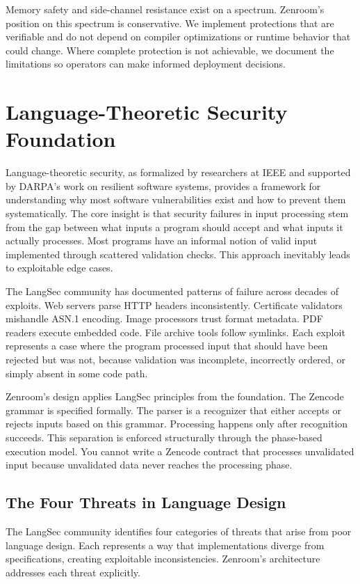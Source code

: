 Memory safety and side-channel resistance exist on a
spectrum. Zenroom's position on this spectrum is conservative. We
implement protections that are verifiable and do not depend on
compiler optimizations or runtime behavior that could change. Where
complete protection is not achievable, we document the limitations so
operators can make informed deployment decisions.

\section{Language-Theoretic Security Foundation}

Language-theoretic security, as formalized by researchers at IEEE and
supported by DARPA's work on resilient software systems, provides a
framework for understanding why most software vulnerabilities exist
and how to prevent them systematically. The core insight is that
security failures in input processing stem from the gap between what
inputs a program should accept and what inputs it actually
processes. Most programs have an informal notion of valid input
implemented through scattered validation checks. This approach
inevitably leads to exploitable edge cases.

The LangSec community has documented patterns of failure across
decades of exploits. Web servers parse HTTP headers
inconsistently. Certificate validators mishandle ASN.1 encoding. Image
processors trust format metadata. PDF readers execute embedded
code. File archive tools follow symlinks. Each exploit represents a
case where the program processed input that should have been rejected
but was not, because validation was incomplete, incorrectly ordered,
or simply absent in some code path.

Zenroom's design applies LangSec principles from the foundation. The
Zencode grammar is specified formally. The parser is a recognizer that
either accepts or rejects inputs based on this grammar. Processing
happens only after recognition succeeds. This separation is enforced
structurally through the phase-based execution model. You cannot write
a Zencode contract that processes unvalidated input because
unvalidated data never reaches the processing phase.

\subsection{The Four Threats in Language Design}

The LangSec community identifies four categories of threats that arise
from poor language design. Each represents a way that implementations
diverge from specifications, creating exploitable
inconsistencies. Zenroom's architecture addresses each threat
explicitly.

